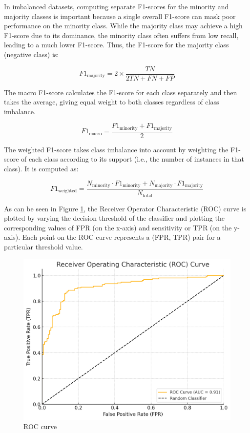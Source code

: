		In imbalanced datasets, computing separate F1-scores for the minority and majority classes is important because a single overall F1-score can mask poor performance on the minority class. While the majority class may achieve a high F1-score due to its dominance, the minority class often suffers from low recall, leading to a much lower F1-score. Thus, the F1-score for the majority class (negative class) is:
		
		$$F1_{\text{majority}} = 2 \times \frac{TN}{2TN + FN + FP}$$ 
		
		
		The macro F1-score calculates the F1-score for each class separately and then takes the average, giving equal weight to both classes regardless of class imbalance.
		
		$$F1_{\text{macro}} = \frac{F1_{\text{minority}} + F1_{\text{majority}}}{2}$$
		
		
		The weighted F1-score takes class imbalance into account by weighting the F1-score of each class according to its support (i.e., the number of instances in that class). It is computed as:
		
		$$F1_{\text{weighted}} = \frac{N_{\text{minority}} \cdot F1_{\text{minority}} + N_{\text{majority}} \cdot F1_{\text{majority}}}{N_{\text{total}}}$$
		
		
		
		\bigskip

		As can be seen in Figure \ref{fig:img-receiver-operator-characteristic-curve}, the Receiver Operator Characteristic (ROC) curve is plotted by varying the decision threshold of the classifier and plotting the corresponding values of FPR (on the x-axis) and sensitivity or TPR (on the y-axis). Each point on the ROC curve represents a (FPR, TPR) pair for a particular threshold value.
		
		\begin{figure}[H]
			\centering
			\includegraphics[width=0.7\linewidth]{img/img-receiver-operator-characteristic-curve}
			\caption{ROC curve}
			\label{fig:img-receiver-operator-characteristic-curve}
		\end{figure}
	
